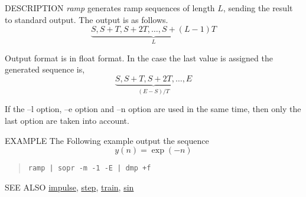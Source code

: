 \begin{synopsis}
\item[ramp] [ --l $L$ ] [ --n $N$ ] [ --s $S$ ] [ --e $E$ ] [ --t $T$ ]
\end{synopsis}

\begin{qsection}{DESCRIPTION}
{\em ramp} generates ramp sequences of length $L$, 
sending the result to standard output. 
The output is as follows.
\begin{displaymath}
\underbrace{S, S+T, S+2T,  \dots, S+(L-1)T}_{L}
\end{displaymath}
\par
Output format is in float format.
In the case the last value is assigned 
the generated sequence is,
\begin{displaymath}
\underbrace{S, S+T, S+2T,  \dots, E}_{(E-S)/T}
\end{displaymath}
\par
If the --l option, --e option and --n option are used
in the same time, then only the last option are taken into account.
\end{qsection}

\begin{options}
\end{options}

\begin{qsection}{EXAMPLE}
The Following example output the sequence 
\begin{displaymath}
  y(n)=\exp(-n)
\end{displaymath}
\begin{quote}
\verb!ramp | sopr -m -1 -E | dmp +f!
\end{quote}
\end{qsection}

\begin{qsection}{SEE ALSO}
\hyperlink{impulse}{impulse},
\hyperlink{step}{step},
\hyperlink{train}{train},
\hyperlink{sin}{sin}
\end{qsection}
